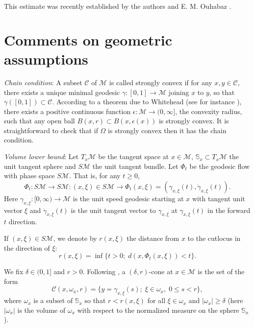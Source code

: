 \documentclass{birkjour}
\begin{document}
\smallskip
This estimate was recently established by the authors and E. M. Ouhabaz \cite{CKO}.


\section{Comments on geometric assumptions} {\it Chain condition}: A subset $\mathcal{C}$ of $\mathcal{M}$ is called strongly convex if for any $x,y\in \mathcal{C}$, there exists a unique minimal geodesic $\gamma :[0,1]\rightarrow \mathcal{M}$ joining $x$ to $y$, so that $\gamma ([0,1])\subset \mathcal{C}$. According to a theorem due to Whitehead (see for instance \cite[pages 161 and 162]{GKM}), there exists a positive continuous function $\epsilon :\mathcal{M}\rightarrow (0,\infty ]$, the convexity radius, such that any open ball $B(x,r)\subset B(x,\epsilon (x))$ is strongly convex. It is straightforward to check that if $\Omega$ is strongly convex then it has the chain condition.

\smallskip
{\it Volume lower bound}: Let $T_x\mathcal{M}$ be the tangent space at $x\in \mathcal{M}$, $\mathbb{S}_x\subset T_x\mathcal{M}$ the unit tangent sphere and $S\mathcal{M}$ the unit tangent bundle. Let $\Phi_t$ be the geodesic flow with phase space $S\mathcal{M}$. That is, for any $t\geq 0$, 
\[
\Phi_t:S\mathcal{M}\rightarrow S\mathcal{M}: (x,\xi )\in S\mathcal{M} \rightarrow\Phi_t (x,\xi )=\left( \gamma_{x,\xi }(t),\dot{\gamma}_{x,\xi }(t)\right).
\]
Here $\gamma_{x,\xi}:[0,\infty )\rightarrow \mathcal{M}$ is the unit speed geodesic starting at $x$ with tangent unit vector $\xi$ and $\dot{\gamma}_{x,\xi}(t)$ is the unit tangent vector to $\gamma_{x,\xi}$ at $\gamma_{x,\xi}(t)$ in the forward $t$ direction.

\smallskip
If $(x,\xi)\in S\mathcal{M}$, we denote by $r(x,\xi)$ the distance from $x$ to the cutlocus in the direction of $\xi$:
\[
r(x,\xi )=\inf\{t>0;\; d(x,\Phi_t(x,\xi ))<t\}.
\]

We fix $\delta \in (0,1]$ and $r>0$.  Following \cite{Sa}, a $(\delta ,r)$-cone at $x\in \mathcal{M}$ is the set of the form
\[
\mathscr{C}(x,\omega _x,r)=\{ y=\gamma_{x,\xi}(s);\; \xi\in \omega _x,\; 0\leq s<r\},
\]
where $\omega _x$ is a subset of $\mathbb{S}_x$ so that $r<r(x,\xi )$ for all $\xi \in \omega_x$ and $|\omega _x |\geq \delta$ (here $|\omega _x|$ is the volume of $\omega _x$ with respect to the normalized measure on the sphere $\mathbb{S}_x$).
\end{document}
